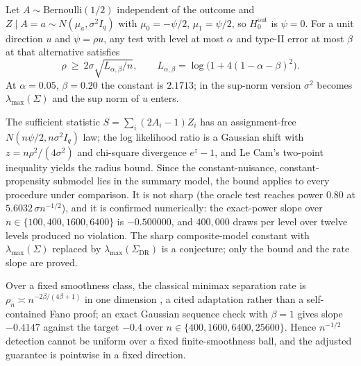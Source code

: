 \begin{theorem}
\label{thm:minimax-lecam}
Let $A\sim\mathrm{Bernoulli}(1/2)$ independent of the outcome and $Z\mid A=a\sim N(\mu_a,\sigma^2I_q)$ with $\mu_0=-\psi/2$, $\mu_1=\psi/2$, so $H_0^{\mathrm{out}}$ is $\psi=0$. For a unit direction $u$ and $\psi=\rho u$, any test with level at most $\alpha$ and type-II error at most $\beta$ at that alternative satisfies
\[
\rho\ \ge\ 2\sigma\sqrt{L_{\alpha,\beta}/n},\qquad L_{\alpha,\beta}=\log\bigl(1+4(1-\alpha-\beta)^2\bigr).
\]
At $\alpha=0.05$, $\beta=0.20$ the constant is $2.1713$; in the sup-norm version $\sigma^2$ becomes $\lambda_{\max}(\Sigma)$ and the sup norm of $u$ enters.
\end{theorem}
The sufficient statistic $S=\sum_i(2A_i-1)Z_i$ has an assignment-free $N(n\psi/2,n\sigma^2I_q)$ law; the log likelihood ratio is a Gaussian shift with $z=n\rho^2/(4\sigma^2)$ and chi-square divergence $e^z-1$, and Le Cam's two-point inequality \cite{le_cam_1986} yields the radius bound. Since the constant-nuisance, constant-propensity submodel lies in the summary model, the bound applies to every procedure under comparison. It is not sharp (the oracle test reaches power $0.80$ at $5.6032\,\sigma n^{-1/2}$), and it is confirmed numerically: the exact-power slope over $n\in\{100,400,1600,6400\}$ is $-0.500000$, and $400{,}000$ draws per level over twelve levels produced no violation. The sharp composite-model constant with $\lambda_{\max}(\Sigma)$ replaced by $\lambda_{\max}(\Sigma_{\mathrm{DR}})$ is a conjecture; only the bound and the rate slope are proved.

Over a fixed smoothness class, the classical minimax separation rate is $\rho_n\asymp n^{-2\beta/(4\beta+1)}$ in one dimension \cite{ingster_1993,ingster_suslina_2003,tsybakov_2009}, a cited adaptation rather than a self-contained Fano proof; an exact Gaussian sequence check with $\beta=1$ gives slope $-0.4147$ against the target $-0.4$ over $n\in\{400,1600,6400,25600\}$. Hence $n^{-1/2}$ detection cannot be uniform over a fixed finite-smoothness ball, and the adjusted guarantee is pointwise in a fixed direction.


